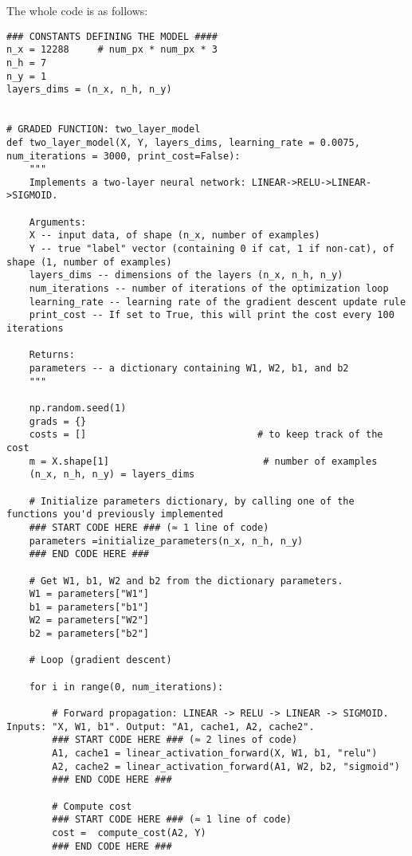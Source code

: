 The whole code is as follows:

\begin{verbatim}
### CONSTANTS DEFINING THE MODEL ####
n_x = 12288     # num_px * num_px * 3
n_h = 7
n_y = 1
layers_dims = (n_x, n_h, n_y)


# GRADED FUNCTION: two_layer_model
def two_layer_model(X, Y, layers_dims, learning_rate = 0.0075, num_iterations = 3000, print_cost=False):
    """
    Implements a two-layer neural network: LINEAR->RELU->LINEAR->SIGMOID.
    
    Arguments:
    X -- input data, of shape (n_x, number of examples)
    Y -- true "label" vector (containing 0 if cat, 1 if non-cat), of shape (1, number of examples)
    layers_dims -- dimensions of the layers (n_x, n_h, n_y)
    num_iterations -- number of iterations of the optimization loop
    learning_rate -- learning rate of the gradient descent update rule
    print_cost -- If set to True, this will print the cost every 100 iterations 
    
    Returns:
    parameters -- a dictionary containing W1, W2, b1, and b2
    """
    
    np.random.seed(1)
    grads = {}
    costs = []                              # to keep track of the cost
    m = X.shape[1]                           # number of examples
    (n_x, n_h, n_y) = layers_dims
    
    # Initialize parameters dictionary, by calling one of the functions you'd previously implemented
    ### START CODE HERE ### (≈ 1 line of code)
    parameters =initialize_parameters(n_x, n_h, n_y)
    ### END CODE HERE ###
    
    # Get W1, b1, W2 and b2 from the dictionary parameters.
    W1 = parameters["W1"]
    b1 = parameters["b1"]
    W2 = parameters["W2"]
    b2 = parameters["b2"]
    
    # Loop (gradient descent)

    for i in range(0, num_iterations):

        # Forward propagation: LINEAR -> RELU -> LINEAR -> SIGMOID. Inputs: "X, W1, b1". Output: "A1, cache1, A2, cache2".
        ### START CODE HERE ### (≈ 2 lines of code)
        A1, cache1 = linear_activation_forward(X, W1, b1, "relu")
        A2, cache2 = linear_activation_forward(A1, W2, b2, "sigmoid")
        ### END CODE HERE ###
        
        # Compute cost
        ### START CODE HERE ### (≈ 1 line of code)
        cost =  compute_cost(A2, Y)
        ### END CODE HERE ###
        

\end{verbatim}
